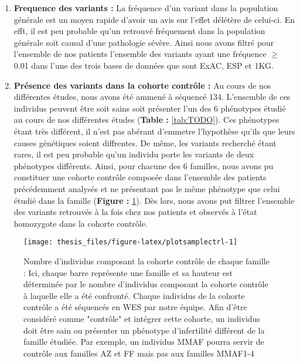 \documentclass[12pt,twoside]{reedthesis}
\providecommand{\tightlist}{%
  \setlength{\itemsep}{0pt}\setlength{\parskip}{0pt}}
\theoremstyle{definition}
\theoremstyle{definition}
\theoremstyle{remark}
\begin{document}
  \begin{enumerate}
  \def\labelenumi{\arabic{enumi}.}
  \setcounter{enumi}{4}
  \tightlist
  \item
    \textbf{Frequence des variants :} La fréquence d'un variant dans la
    population générale est un moyen rapide d'avoir un avis sur l'effet
    délétère de celui-ci. En efft, il est peu probable qu'un retrouvé
    fréquement dans la population générale soit causal d'une pathologie
    sévère. Ainsi nous avons filtré pour l'ensemble de nos patients
    l'ensemble des variants ayant une fréquence \(\ge\) 0.01 dans l'une
    des trois bases de données que sont ExAC, ESP et 1KG.\\
  \item
    \textbf{Présence des variants dans la cohorte contrôle :} Au cours de
    nos différentes études, nous avons été ammené à séquencé 134.
    L'ensemble de ces individus peuvent être soit sains soit présenter
    l'un des 6 phénotypes étudié au cours de nos différentes études
    (\textbf{Table : }\ref{tab:TODO}). Ces phénotypes étant très
    différent, il n'est pas abérant d'emmetre l'hypothèse qu'ils que leurs
    causes génétiques soient diffrentes. De même, les variants recherché
    étant rares, il est peu probable qu'un individu porte les variants de
    deux phénotypes différents. Ainsi, pour chacune des 6 familles, nous
    avons pu constituer une cohorte contrôle composée dans l'ensemble des
    patients précédemment analysés et ne présentant pas le même phénotype
    que celui étudié dans la famille (\textbf{Figure :}
    \ref{fig:plotsamplectrl}). Dès lors, nous avons put filtrer l'ensemble
    des variants retrouvés à la fois chez nos patients et observés à
    l'état homozygote dans la cohorte contrôle.
  \end{enumerate}
  
  \begin{figure}
  
  {\centering \texttt{[image: thesis\_files/figure-latex/plotsamplectrl-1]} 
  
  }
  
  \caption[Nombre d'individus composant la cohorte contrôle de chaque famille]{Nombre d'individus composant la cohorte contrôle de chaque famille : Ici, chaque barre représente une famille et sa hauteur est déterminée par le nombre d'individus composant la cohorte contrôle à laquelle elle a été confronté. Chaque individus de la cohorte contrôle a été séquencés en WES par notre équipe. Afin d'être considéré comme "contrôle" et intégrer cette cohorte, un individus doit être sain ou présenter un phénotype d'infertilité différent de la famille étudiée. Par exemple, un individus MMAF pourra servir de contrôle aux familles AZ et FF mais pas aux familles MMAF1-4}\label{fig:plotsamplectrl}
  \end{figure}
  
\end{document}
